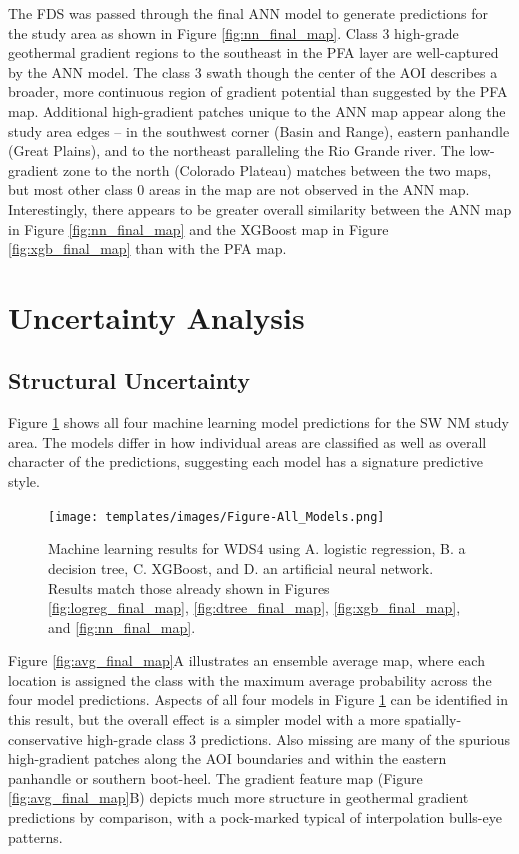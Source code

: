 The FDS was passed through the final ANN model to generate predictions for the study area as shown in Figure \ref{fig:nn_final_map}. Class 3 high-grade geothermal gradient regions to the southeast in the \citet{bielicki_hydrogeolgic_2015} PFA layer are well-captured by the ANN model. The class 3 swath though the center of the AOI describes a broader, more continuous region of gradient potential than suggested by the PFA map. Additional high-gradient patches unique to the ANN map appear along the study area edges – in the southwest corner (Basin and Range), eastern panhandle (Great Plains), and to the northeast paralleling the Rio Grande river. The low-gradient zone to the north (Colorado Plateau) matches between the two maps, but most other class 0 areas in the \citeauthor{bielicki_hydrogeolgic_2015} map are not observed in the ANN map. Interestingly, there appears to be greater overall similarity between the ANN map in Figure \ref{fig:nn_final_map} and the XGBoost map in Figure \ref{fig:xgb_final_map} than with the PFA map.
\vfill
\section{Uncertainty Analysis}\label{ch5:uncertainty_analysis}
\subsection{Structural Uncertainty}\label{ch5:structural_uncertainty}
Figure \ref{fig:combined_maps} shows all four machine learning model predictions for the SW NM study area. The models differ in how individual areas are classified as well as overall character of the predictions, suggesting each model has a signature predictive style.

\begin{figure}[!htp]
\centering
\texttt{[image: templates/images/Figure-All\_Models.png]}
\caption[Combined machine learning results]{Machine learning results for WDS4 using A. logistic regression, B. a decision tree, C. XGBoost, and D. an artificial neural network. Results match those already shown in Figures \ref{fig:logreg_final_map}, \ref{fig:dtree_final_map}, \ref{fig:xgb_final_map}, and \ref{fig:nn_final_map}.}
\label{fig:combined_maps}
\end{figure}

Figure \ref{fig:avg_final_map}A illustrates an ensemble average map, where each location is assigned the class with the maximum average probability across the four model predictions. Aspects of all four models in Figure \ref{fig:combined_maps} can be identified in this result, but the overall effect is a simpler model with a more spatially-conservative high-grade class 3 predictions. Also missing are many of the spurious high-gradient patches along the AOI boundaries and within the eastern panhandle or southern boot-heel. The \citeauthor{bielicki_hydrogeolgic_2015} gradient feature map (Figure \ref{fig:avg_final_map}B) depicts much more structure in geothermal gradient predictions by comparison, with a pock-marked typical of interpolation bulls-eye patterns.

